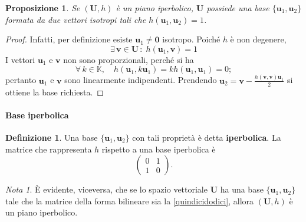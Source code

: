 \documentclass{article}
\theoremstyle{plain}
\newtheorem{prop}[thm]{Proposizione}
\theoremstyle{definition}
\newtheorem{defn}{Definizione}[section]
\theoremstyle{remark}
\newtheorem{note}{Nota}
\begin{document}
\vspace{10pt}

\begin{bxthm}
\begin{prop}
Se $(\mathbf{U}, h)$ è un piano iperbolico, $\mathbf{U}$ possiede una base $\{\mathbf{u}_1, \mathbf{u}_2\}$ 
formata da due vettori isotropi tali che $h(\mathbf{u}_1, \mathbf{u}_2) = 1$.
\end{prop}
\end{bxthm}
\begin{proof}
Infatti, per definizione esiste $\mathbf{u}_1 \neq \mathbf{0}$ isotropo. Poiché $h$ è non degenere, 
\[\exists\,\mathbf{v} \in \mathbf{U}\,:\;h(\mathbf{u}_1, \mathbf{v}) =1\]
I vettori $\mathbf{u}_1$ e $\mathbf{v}$ non sono proporzionali, perché si ha 
\[\forall\,k\in\mathbb{K},\quad h(\mathbf{u}_1, k\mathbf{u}_1) = kh(\mathbf{u}_1, \mathbf{u}_1) = 0;\]
pertanto $\mathbf{u}_1$ e $\mathbf{v}$ sono linearmente indipendenti. 
Prendendo $\mathbf{u}_2 = \mathbf{v} - \frac{h(\mathbf{v}, \mathbf{v})\mathbf{u}_1}{2}$ si ottiene 
la base richiesta.
\end{proof}

\vspace{10pt}

\paragraph{Base iperbolica}
\begin{bxthm}
\begin{defn}
Una base $\{\mathbf{u}_1, \mathbf{u}_2\}$ con tali proprietà è detta \textbf{iperbolica}. 
La matrice che rappresenta $h$ rispetto a una base iperbolica è
\begin{equation}\label{quindicidodici}
\begin{pmatrix} 0 & 1 \\ 1 & 0 \end{pmatrix}.    
\end{equation}
\end{defn}
\end{bxthm}

\vspace{10pt}

\begin{note}
È evidente, viceversa, che se lo spazio vettoriale $\mathbf{U}$ ha una base 
$\{\mathbf{u}_1, \mathbf{u}_2\}$ tale che la matrice della forma bilineare sia la \ref{quindicidodici}, 
allora $(\mathbf{U}, h)$ è un piano iperbolico.    
\end{note}
\end{document}
